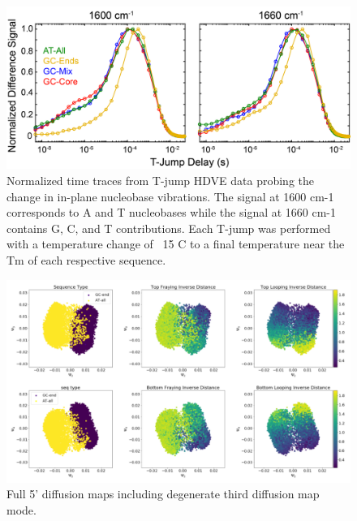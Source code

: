 \documentclass[journal=jpcbfk,manuscript=article]{achemso}
\begin{document}
\begin{figure}[ht!]
	\begin{center}
        \includegraphics[width=120mm, 
        scale=0.5]{Figs/figs_imp/GCSeq_TJTraces.png}
        \caption{Normalized time traces from T-jump HDVE data probing the change in in-plane nucleobase vibrations. The signal at 1600 cm-1 corresponds to A and T nucleobases while the signal at 1660 cm-1 contains G, C, and T contributions. Each T-jump was performed with a temperature change of ~15 C to a final temperature near the Tm of each respective sequence.}
        \label{fig:fast_stretching}
	\end{center}
\end{figure}

\begin{figure}[ht!]
	\begin{center}
        \includegraphics[width=\textwidth]{Figs/figs_imp/GC-end_dmaps_full.PNG}
        \caption{Full 5' diffusion maps including degenerate third diffusion map mode.}
        \label{fig:GC-end_dmaps_full}
	\end{center}
\end{figure}
\end{document}
